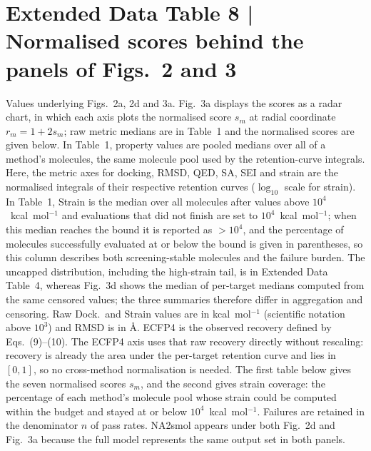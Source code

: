 \section*{Extended Data Table 8 | Normalised scores behind the panels of Figs.~2 and 3}
Values underlying Figs.~2a, 2d and 3a. Fig.~3a displays the scores as a radar chart, in which each axis plots the normalised score $s_m$ at radial coordinate $r_m = 1 + 2s_m$; raw metric medians are in Table~1 and the normalised scores are given below. In Table~1, property values are pooled medians over all of a method's molecules, the same molecule pool used by the retention-curve integrals. Here, the metric axes for docking, RMSD, QED, SA, SEI and strain are the normalised integrals of their respective retention curves ($\log_{10}$ scale for strain). In Table~1, Strain is the median over all molecules after values above $10^{4}$~kcal~mol$^{-1}$ and evaluations that did not finish are set to $10^{4}$~kcal~mol$^{-1}$; when this median reaches the bound it is reported as $>10^{4}$, and the percentage of molecules successfully evaluated at or below the bound is given in parentheses, so this column describes both screening-stable molecules and the failure burden. The uncapped distribution, including the high-strain tail, is in Extended Data Table~4, whereas Fig.~3d shows the median of per-target medians computed from the same censored values; the three summaries therefore differ in aggregation and censoring. Raw Dock.\ and Strain values are in kcal~mol$^{-1}$ (scientific notation above $10^3$) and RMSD is in \AA. ECFP4 is the observed recovery defined by Eqs.~(9)--(10). The ECFP4 axis uses that raw recovery directly without rescaling: recovery is already the area under the per-target retention curve and lies in $[0,1]$, so no cross-method normalisation is needed. The first table below gives the seven normalised scores $s_m$, and the second gives strain coverage: the percentage of each method's molecule pool whose strain could be computed within the budget and stayed at or below $10^{4}$~kcal~mol$^{-1}$. Failures are retained in the denominator $n$ of pass rates. NA2smol appears under both Fig.~2d and Fig.~3a because the full model represents the same output set in both panels.

\bigskip

